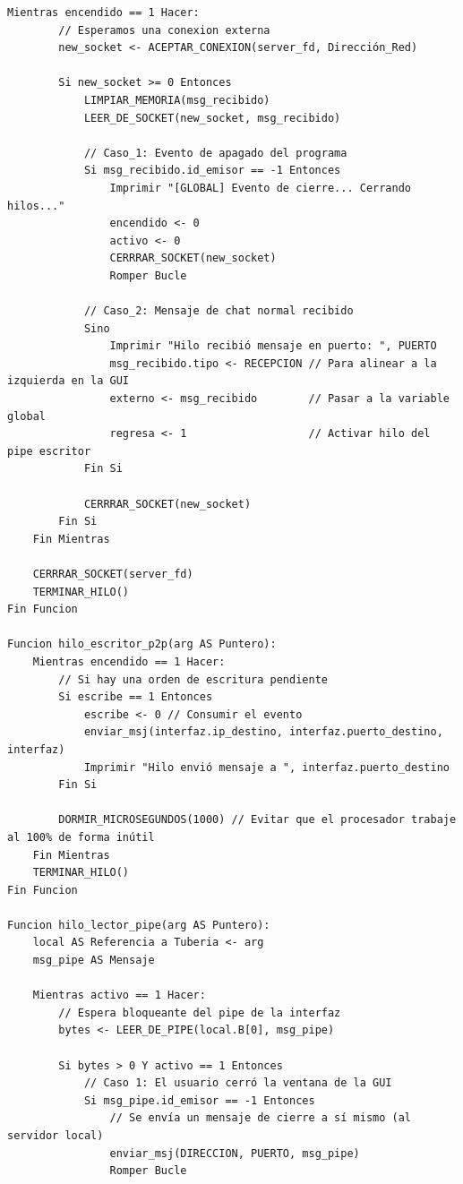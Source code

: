 \begin{lstlisting}[style=estiloPseudo]
    Mientras encendido == 1 Hacer:
        // Esperamos una conexion externa
        new_socket <- ACEPTAR_CONEXION(server_fd, Dirección_Red)
        
        Si new_socket >= 0 Entonces
            LIMPIAR_MEMORIA(msg_recibido)
            LEER_DE_SOCKET(new_socket, msg_recibido)

            // Caso_1: Evento de apagado del programa
            Si msg_recibido.id_emisor == -1 Entonces
                Imprimir "[GLOBAL] Evento de cierre... Cerrando hilos..."
                encendido <- 0
                activo <- 0
                CERRRAR_SOCKET(new_socket)
                Romper Bucle
                
            // Caso_2: Mensaje de chat normal recibido
            Sino
                Imprimir "Hilo recibió mensaje en puerto: ", PUERTO
                msg_recibido.tipo <- RECEPCION // Para alinear a la izquierda en la GUI
                externo <- msg_recibido        // Pasar a la variable global
                regresa <- 1                   // Activar hilo del pipe escritor
            Fin Si
            
            CERRRAR_SOCKET(new_socket)
        Fin Si
    Fin Mientras

    CERRRAR_SOCKET(server_fd)
    TERMINAR_HILO()
Fin Funcion

Funcion hilo_escritor_p2p(arg AS Puntero):
    Mientras encendido == 1 Hacer:
        // Si hay una orden de escritura pendiente
        Si escribe == 1 Entonces
            escribe <- 0 // Consumir el evento
            enviar_msj(interfaz.ip_destino, interfaz.puerto_destino, interfaz)
            Imprimir "Hilo envió mensaje a ", interfaz.puerto_destino
        Fin Si
        
        DORMIR_MICROSEGUNDOS(1000) // Evitar que el procesador trabaje al 100% de forma inútil
    Fin Mientras
    TERMINAR_HILO()
Fin Funcion

Funcion hilo_lector_pipe(arg AS Puntero):
    local AS Referencia a Tuberia <- arg
    msg_pipe AS Mensaje

    Mientras activo == 1 Hacer:
        // Espera bloqueante del pipe de la interfaz
        bytes <- LEER_DE_PIPE(local.B[0], msg_pipe)
        
        Si bytes > 0 Y activo == 1 Entonces
            // Caso 1: El usuario cerró la ventana de la GUI
            Si msg_pipe.id_emisor == -1 Entonces
                // Se envía un mensaje de cierre a sí mismo (al servidor local)
                enviar_msj(DIRECCION, PUERTO, msg_pipe)
                Romper Bucle
                

\end{lstlisting}
